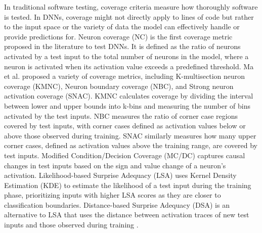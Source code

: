 In traditional software testing, coverage criteria measure how thoroughly software is tested. In DNNs, coverage might not directly apply to lines of code but rather to the input space or the variety of data the model can effectively handle or provide predictions for. Neuron coverage (NC) \cite{deepxplore} is the first coverage metric proposed in the literature to test DNNs. It is defined as the ratio of neurons activated by a test input to the total number of neurons in the model, where a neuron is activated when its activation value exceeds a predefined threshold. Ma et al. \cite{Ma} proposed a variety of coverage metrics, including K-multisection neuron coverage (KMNC), Neuron boundary coverage (NBC), and Strong neuron activation coverage (SNAC). KMNC calculates coverage by dividing the interval between lower and upper bounds into k-bins and measuring the number of bins activated by the test inputs. NBC measures the ratio of corner case regions covered by test inputs, with corner cases defined as activation values below or above those observed during training. SNAC similarly measures how many upper corner cases, defined as activation values above the training range, are covered by test inputs. Modified Condition/Decision Coverage (MC/DC) \cite{SunY} captures causal changes in test inputs based on the sign and value change of a neuron's activation. Likelihood-based Surprise Adequacy (LSA) uses Kernel Density Estimation (KDE) to estimate the likelihood of a test input during the training phase, prioritizing inputs with higher LSA scores as they are closer to classification boundaries. Distance-based Surprise Adequacy (DSA) is an alternative to LSA that uses the distance between activation traces of new test inputs and those observed during training \cite{Kim}.

